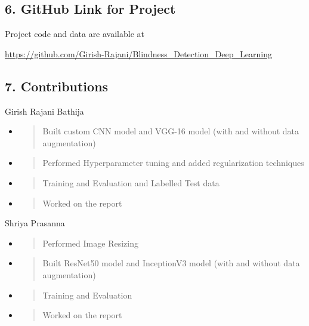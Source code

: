 \documentclass[
]{article}
\begin{document}
\hypertarget{github-link-for-project}{%
\subsection{\texorpdfstring{\textbf{6. GitHub Link for
Project}}{GitHub Link for Project}}\label{github-link-for-project}}

Project code and data are available at

\href{https://github.com/Girish-Rajani/Blindness_Detection_Deep_Learning}{\underline{https://github.com/Girish-Rajani/Blindness\_Detection\_Deep\_Learning}}

\hypertarget{contributions}{%
\subsection{\texorpdfstring{\textbf{7. Contributions}}{Contributions}}\label{contributions}}

Girish Rajani Bathija

\begin{itemize}
\item
  \begin{quote}
  Built custom CNN model and VGG-16 model (with and without data
  augmentation)
  \end{quote}
\item
  \begin{quote}
  Performed Hyperparameter tuning and added regularization techniques
  \end{quote}
\item
  \begin{quote}
  Training and Evaluation and Labelled Test data
  \end{quote}
\item
  \begin{quote}
  Worked on the report
  \end{quote}
\end{itemize}

Shriya Prasanna

\begin{itemize}
\item
  \begin{quote}
  Performed Image Resizing
  \end{quote}
\end{itemize}

\begin{itemize}
\item
  \begin{quote}
  Built ResNet50 model and InceptionV3 model (with and without data
  augmentation)
  \end{quote}
\item
  \begin{quote}
  Training and Evaluation
  \end{quote}
\item
  \begin{quote}
  Worked on the report
  \end{quote}
\end{itemize}
\end{document}
